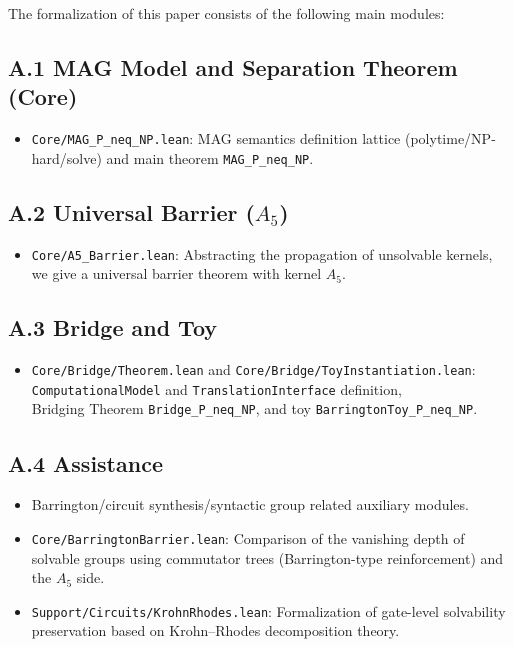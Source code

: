 \documentclass[11pt,a4paper]{article}
\theoremstyle{plain}
\theoremstyle{definition}
\newcommand{\Aalt}{A_5}
\newcommand{\TranslationInterface}{\texttt{TranslationInterface}}
\newcommand{\ComputationalModel}{\texttt{ComputationalModel}}
\newcommand{\lean}[1]{\texttt{#1}}
\begin{document}
The formalization of this paper consists of the following main modules:

\subsection*{A.1 MAG Model and Separation Theorem (Core)}
\begin{itemize}[nosep]
\item \lean{Core/MAG\_P\_neq\_NP.lean}: MAG semantics definition lattice (polytime/NP-hard/solve) and main theorem \lean{MAG\_P\_neq\_NP}.
\end{itemize}

\subsection*{A.2 Universal Barrier ($\Aalt$)}
\begin{itemize}[nosep]
\item \lean{Core/A5\_Barrier.lean}: Abstracting the propagation of unsolvable kernels, we give a universal barrier theorem with kernel $\Aalt$.
\end{itemize}

\subsection*{A.3 Bridge and Toy}
\begin{itemize}[nosep]
\item \lean{Core/Bridge/Theorem.lean} and \lean{Core/Bridge/ToyInstantiation.lean}:\\
\ComputationalModel{} and \TranslationInterface{} definition,\\
Bridging Theorem \lean{Bridge\_P\_neq\_NP}, and toy \lean{BarringtonToy\_P\_neq\_NP}.
\end{itemize}

\subsection*{A.4 Assistance}
\begin{itemize}[nosep]
\item Barrington/circuit synthesis/syntactic group related auxiliary modules.
\item \lean{Core/BarringtonBarrier.lean}: Comparison of the vanishing depth of solvable groups using commutator trees (Barrington-type reinforcement) and the $\Aalt$ side.
\item \lean{Support/Circuits/KrohnRhodes.lean}: Formalization of gate-level solvability preservation based on Krohn--Rhodes decomposition theory.
\end{itemize}
\end{document}
